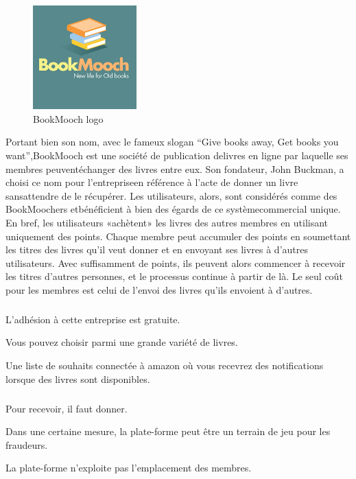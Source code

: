\begin{figure}
\includegraphics[width=4cm]{Images/chapter1/bookMoochLogo.jpg}
\caption{BookMooch logo}
\end{figure}
\tab Portant bien son nom, avec le fameux slogan ​“Give books away, Get books you want”,BookMooch est une société de publication delivres en ligne par laquelle ses membres peuventéchanger des livres entre eux. Son fondateur,
John Buckman, a choisi ce nom pour l'entrepriseen référence à l'acte de donner un livre sansattendre de le récupérer. Les utilisateurs, alors, sont considérés comme des BookMoochers etbénéficient à bien des égards de ce systèmecommercial unique.\\
\tab En bref, les utilisateurs «achètent» les livres des autres membres	en utilisant uniquement des points. Chaque membre peut accumuler des points en soumettant les titres des livres qu'il veut donner et en envoyant ses livres à d'autres utilisateurs. Avec suffisamment de points, ils peuvent alors commencer à recevoir les titres d'autres personnes, et le processus continue à partir de là. Le seul coût pour les membres est celui de l'envoi des livres qu'ils envoient à d'autres.\\

\subparagraph*{}
\begin{list}{•}{\textbf{Avantages}}
\item L'adhésion à cette entreprise est gratuite.
\item Vous pouvez choisir parmi une grande variété de livres.
\item Une liste de souhaits connectée à amazon où vous recevrez des notifications lorsque des livres sont disponibles.
\end{list}

\subparagraph*{}
\begin{list}{•}{\textbf{Inconvénients}}
\item Pour recevoir, il faut donner.
\item Dans une certaine mesure, la plate-forme peut être un terrain de jeu pour les fraudeurs.
\item La plate-forme n'exploite pas l'emplacement des membres.
\end{list}
\newpage

